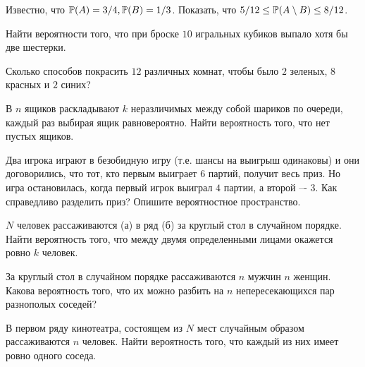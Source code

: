 \begin{problem}
    Известно, что $\operatorname{\mathbb{P}}(A) = 3 / 4, \operatorname{\mathbb{P}}(B) = 1 / 3$.
    Показать, что $5 / 12 \leq \operatorname{\mathbb{P}}(A \setminus B) \leq 8 / 12$.
\end{problem}

\begin{problem}
    Найти вероятности того, что при броске $10$ игральных кубиков выпало хотя бы две шестерки.
\end{problem}

\begin{problem}
    Сколько способов покрасить $12$ различных комнат, чтобы было $2$ зеленых, $8$ красных и $2$ синих?
\end{problem}

\begin{problem}
    В $n$ ящиков раскладывают $k$ неразличимых между собой шариков по очереди, каждый раз выбирая ящик равновероятно.
    Найти вероятность того, что нет пустых ящиков.
\end{problem}

\begin{problem}
    Два игрока играют в безобидную игру (т.е. шансы на выигрыш одинаковы) и они договорились, что тот, кто первым выиграет $6$ партий, получит весь приз.
    Но игра остановилась, когда первый игрок выиграл $4$ партии, а второй –- $3$.
    Как справедливо разделить приз?
    Опишите вероятностное пространство.
\end{problem}

\begin{problem}
    $N$ человек рассаживаются (а) в ряд (б) за круглый стол в случайном порядке.
    Найти вероятность того, что между двумя определенными лицами окажется ровно $k$ человек.
\end{problem}

\begin{problem}
    За круглый стол в случайном порядке рассаживаются $n$ мужчин $n$ женщин.
    Какова вероятность того, что их можно разбить на $n$ непересекающихся пар разнополых соседей?
\end{problem}

\begin{problem}
    В первом ряду кинотеатра, состоящем из $N$ мест случайным образом рассаживаются $n$ человек.
    Найти вероятность того, что каждый из них имеет ровно одного соседа.
\end{problem}




